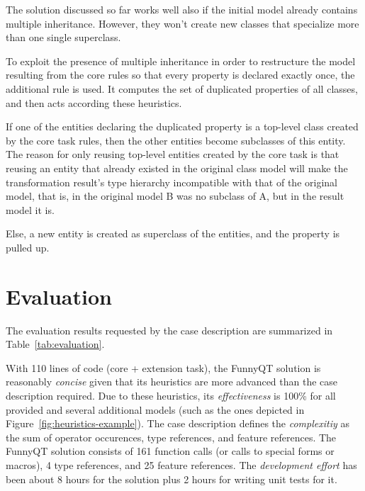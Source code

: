 \documentclass[submission]{eptcs}
\begin{document}
The solution discussed so far works well also if the initial model already
contains multiple inheritance.  However, they won't create new classes that
specialize more than one single superclass.

To exploit the presence of multiple inheritance in order to restructure the
model resulting from the core rules so that every property is declared exactly
once, the additional rule is used.  It computes the set of duplicated
properties of all classes, and then acts according these heuristics.
\begin{compactenum}
\item If one of the entities declaring the duplicated property is a top-level
  class created by the core task rules, then the other entities become
  subclasses of this entity.  The reason for only reusing top-level entities
  created by the core task is that reusing an entity that already existed in
  the original class model will make the transformation result's type hierarchy
  incompatible with that of the original model, that is, in the original model
  B was no subclass of A, but in the result model it is.
\item Else, a new entity is created as superclass of the entities, and the
  property is pulled up.
\end{compactenum}


\section{Evaluation}
\label{sec:evaluation}

The evaluation results requested by the case description
\cite{cdrestructcasedesc} are summarized in Table~\ref{tab:evaluation}.

With 110 lines of code (core + extension task), the FunnyQT solution is
reasonably \emph{concise} given that its heuristics are more advanced than the
case description required.  Due to these heuristics, its \emph{effectiveness}
is 100\% for all provided and several additional models (such as the ones
depicted in Figure~\ref{fig:heuristics-example}).  The case description defines
the \emph{complexitiy} as the sum of operator occurences, type references, and
feature references.  The FunnyQT solution consists of 161 function calls (or
calls to special forms or macros), 4 type references, and 25 feature
references.  The \emph{development effort} has been about 8 hours for the
solution plus 2 hours for writing unit tests for it.
\end{document}
